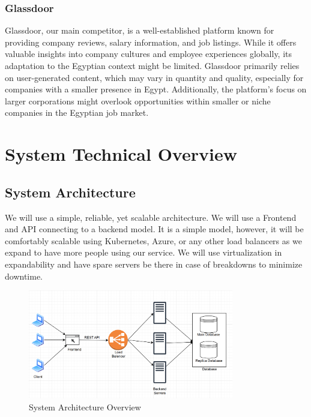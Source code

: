\documentclass[titlepage]{article}
\begin{document}
\subsubsection*{Glassdoor}
Glassdoor, our main competitor, is a well-established platform known for providing company reviews, salary information, and job 
listings. While it offers valuable insights into company cultures and employee experiences globally, its 
adaptation to the Egyptian context might be limited. Glassdoor primarily relies on user-generated content, 
which may vary in quantity and quality, especially for companies with a smaller presence in Egypt. 
Additionally, the platform's focus on larger corporations might overlook opportunities within smaller or niche 
companies in the Egyptian job market.

\newpage

\section{System Technical Overview}
\subsection{System Architecture}
We will use a simple, reliable, yet scalable architecture. We will use a Frontend and API connecting to a 
backend model. It is a simple model, however, it will be comfortably scalable using Kubernetes, Azure, or any 
other load balancers as we expand to have more people using our service. We will use virtualization in
expandability and have spare servers be there in case of breakdowns to minimize downtime. 

\begin{figure}[H]
    \centering
    \includegraphics[width=0.8\textwidth]{Images/ArchOverview.png}
    \caption{System Architecture Overview}
\end{figure}
\end{document}
